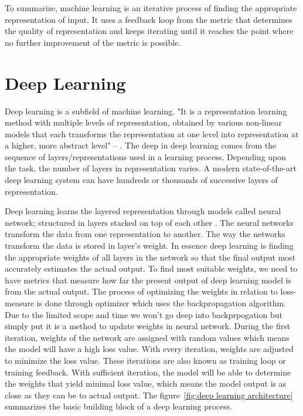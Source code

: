 To summarize, machine learning is an iterative process of finding the appropriate representation of input. It uses a feedback loop from the metric that determines the quality of representation and keeps iterating until it reaches the point where no further improvement of the metric is possible. 

\section{Deep Learning}
Deep learning is a subfield of machine learning. "It is a representation learning method with multiple levels of representation, obtained by various non-linear models that each transforms the representation at one level into representation at a higher, more abstract level" -- \citet{lecun2015deep}. The deep in deep learning comes from the sequence of layers/representations used in a learning process. Depending upon the task, the number of layers in representation varies. A modern state-of-the-art deep learning system can have hundreds or thousands of successive layers of representation. 

Deep learning learns the layered representation through models called neural network; structured in layers stacked on top of each other \citep{chollet2017deep}. The neural networks transform the data from one representation to another. The way the networks transform the data is stored in layer's weight. In essence deep learning is finding the appropriate weights of all layers in the network so that the final output most accurately estimates the actual output. To find most suitable weights, we need to have metrics that measure how far the present output of deep learning model is from the actual output. The process of optimizing the weights in relation to loss-measure is done through optimizer which uses the backpropagation algorithm. Due to the limited scope and time we won't go deep into backprpogation but simply put it is a method to update weights in neural network. During the first iteration, weights of the network are assigned with random values which means the model will have a high loss value. With every iteration, weights are adjusted to minimize the loss value. These iterations are also known as training loop or training feedback. With sufficient iteration, the model will be able to determine the weights that yield minimal loss value, which means the model output is as close as they can be to actual output. The figure~\ref{fig:deep learning architecture} summarizes the basic building block of a deep learning process.  


